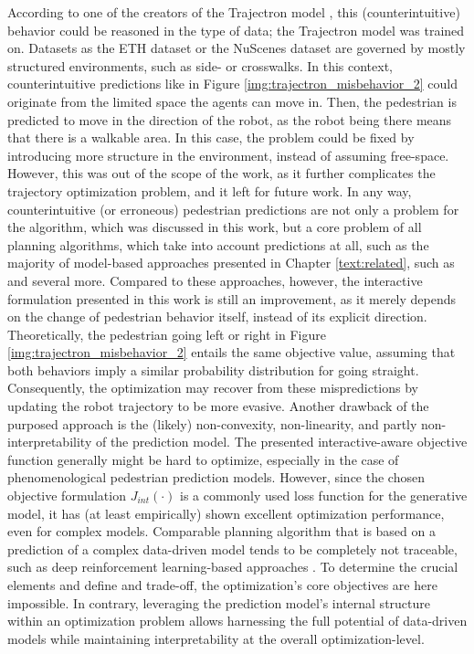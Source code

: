 According to one of the creators of the Trajectron model \cite{Salzmann2020}, this (counterintuitive) behavior could be reasoned in the type of data; the Trajectron model was trained on. Datasets as the ETH dataset \cite{Pellegrini2009} or the NuScenes dataset \cite{Caesar2020} are governed by mostly structured environments, such as side- or crosswalks. In this context, counterintuitive predictions like in Figure \ref{img:trajectron_misbehavior_2} could originate from the limited space the agents can move in. Then, the pedestrian is predicted to move in the direction of the robot, as the robot being there means that there is a walkable area. In this case, the problem could be fixed by introducing more structure in the environment, instead of assuming free-space. However, this was out of the scope of the work, as it further complicates the trajectory optimization problem, and it left for future work. In any way, counterintuitive (or erroneous) pedestrian predictions are not only a problem for the algorithm, which was discussed in this work, but a core problem of all planning algorithms, which take into account predictions at all, such as the majority of model-based approaches presented in Chapter \ref{text:related}, such as \cite{Fox1997}\cite{Phillips2011}\cite{Knepper2012}\cite{Luo2018a}\cite{Nishimura2020a} and several more. Compared to these approaches, however, the interactive formulation presented in this work is still an improvement, as it merely depends on the change of pedestrian behavior itself, instead of its explicit direction. Theoretically, the pedestrian going left or right in Figure \ref{img:trajectron_misbehavior_2} entails the same objective value, assuming that both behaviors imply a similar probability distribution for going straight. Consequently, the optimization may recover from these mispredictions by updating the robot trajectory to be more evasive.
\newline
Another drawback of the purposed approach is the (likely) non-convexity, non-linearity, and partly non-interpretability of the prediction model. The presented interactive-aware objective function generally might be hard to optimize, especially in the case of phenomenological pedestrian prediction models. However, since the chosen objective formulation $J_{int}(\cdot)$ is a commonly used loss function for the generative model, it has (at least empirically) shown excellent optimization performance, even for complex models. Comparable planning algorithm that is based on a prediction of a complex data-driven model tends to be completely not traceable, such as deep reinforcement learning-based approaches \cite{Knepper2012}\cite{Chen2017}\cite{Everett2018}. To determine the crucial elements and define and trade-off, the optimization's core objectives are here impossible. In contrary, leveraging the prediction model's internal structure within an optimization problem allows harnessing the full potential of data-driven models while maintaining interpretability at the overall optimization-level.
